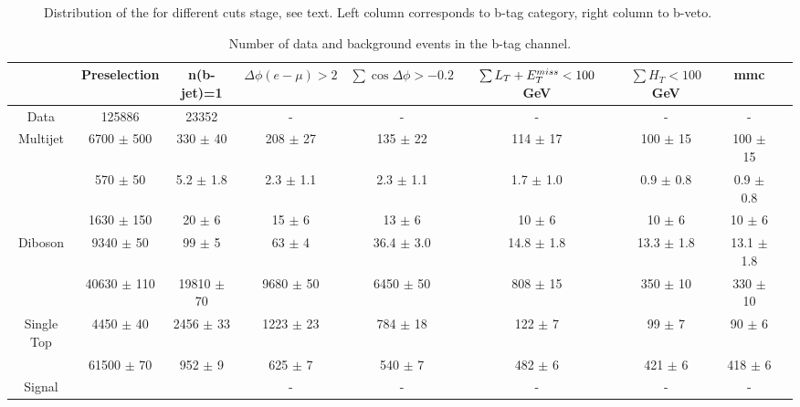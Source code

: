 \begin{figure}[p]
     	

    \caption{\footnotesize Distribution of the \mmc for different cuts stage, see text. Left column corresponds to b-tag category, right column to b-veto.}
   \label{fig:mass}
\end{figure}



\begin{table}
  \centering
   \begin{footnotesize}	
  \begin{tabular}{ccccccccc}
    \hline\hline
	& Preselection			&	n(b-jet)=1			&	$\Delta\phi(e-\mu)>2$			&	$\sum\cos\Delta\phi > -0.2$			&	$\sum L_{T} + E_{T}^{miss} < 100 $ GeV			&	$\sum H_T < 100$ GeV			&	mmc			\\
   \hline
Data	&	125886			&	23352			&	-			&	-			&	-			&	-			&	-			\\
Multijet	&	6700	$\pm$	500	&	330	$\pm$	40	&	208	$\pm$	27	&	135	$\pm$	22	&	114	$\pm$	17	&	100	$\pm$	15	&	100	$\pm$	15	\\
\Zll 	&	570	$\pm$	50	&	5.2	$\pm$	1.8	&	2.3	$\pm$	1.1	&	2.3	$\pm$	1.1	&	1.7	$\pm$	1.0	&	0.9	$\pm$	0.8	&	0.9	$\pm$	0.8	\\
\Wlnu	&	1630	$\pm$	150	&	20	$\pm$	6	&	15	$\pm$	6	&	13	$\pm$	6	&	10	$\pm$	6	&	10	$\pm$	6	&	10	$\pm$	6	\\
Diboson	&	9340	$\pm$	50	&	99	$\pm$	5	&	63	$\pm$	4	&	36.4	$\pm$	3.0	&	14.8	$\pm$	1.8	&	13.3	$\pm$	1.8	&	13.1	$\pm$	1.8	\\
\ttbar	&	40630	$\pm$	110	&	19810	$\pm$	70	&	9680	$\pm$	50	&	6450	$\pm$	50	&	808	$\pm$	15	&	350	$\pm$	10	&	330	$\pm$	10	\\
Single Top	&	4450	$\pm$	40	&	2456	$\pm$	33	&	1223	$\pm$	23	&	784	$\pm$	18	&	122	$\pm$	7	&	99	$\pm$	7	&	90	$\pm$	6	\\
\Ztautau	&	61500	$\pm$	70	&	952	$\pm$	9	&	625	$\pm$	7	&	540	$\pm$	7	&	482	$\pm$	6	&	421	$\pm$	6	&	418	$\pm$	6	\\
Signal	&				&				&	-			&	-			&	-			&	-			&	-			\\
    \hline
    \hline
  \end{tabular}
  \caption{Number of data and background events in the b-tag channel.}
  \label{tab:eventsel:btag}
   \end{footnotesize}	
\end{table}


